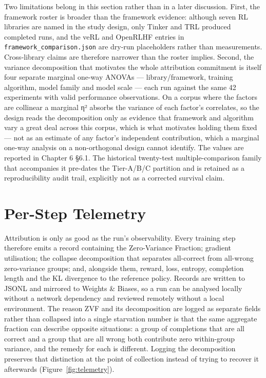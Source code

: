 \documentclass[12pt,a4paper]{report}
\begin{document}
Two limitations belong in this section rather than in a later
discussion. First, the framework roster is broader than the framework
evidence: although seven RL libraries are named in the study design,
only Tinker and TRL produced completed runs, and the veRL and OpenRLHF
entries in \texttt{framework\_comparison.json} are dry-run placeholders
rather than measurements. Cross-library claims are therefore narrower
than the roster implies. Second, the variance decomposition that
motivates the whole attribution commitment is itself four separate
marginal one-way ANOVAs --- library/framework, training algorithm, model
family and model scale --- each run against the same 42 experiments with
valid performance observations. On a corpus where the factors are
collinear a marginal η² absorbs the variance of each factor's
correlates, so the design reads the decomposition only as evidence that
framework and algorithm vary a great deal across this corpus, which is
what motivates holding them fixed --- not as an estimate of any factor's
independent contribution, which a marginal one-way analysis on a
non-orthogonal design cannot identify. The values are reported in
Chapter 6 §6.1. The historical twenty-test multiple-comparison family
that accompanies it pre-dates the Tier-A/B/C partition and is retained
as a reproducibility audit trail, explicitly not as a corrected survival
claim.

\section{Per-Step Telemetry}\label{per-step-telemetry}

Attribution is only as good as the run's observability. Every training
step therefore emits a record containing the Zero-Variance Fraction;
gradient utilisation; the collapse decomposition that separates
all-correct from all-wrong zero-variance groups; and, alongside them,
reward, loss, entropy, completion length and the KL divergence to the
reference policy. Records are written to JSONL and mirrored to Weights
\& Biases, so a run can be analysed locally without a network dependency
and reviewed remotely without a local environment. The reason ZVF and
its decomposition are logged as separate fields rather than collapsed
into a single starvation number is that the same aggregate fraction can
describe opposite situations: a group of completions that are all
correct and a group that are all wrong both contribute zero within-group
variance, and the remedy for each is different. Logging the
decomposition preserves that distinction at the point of collection
instead of trying to recover it afterwards (Figure~\ref{fig:telemetry}).
\end{document}
